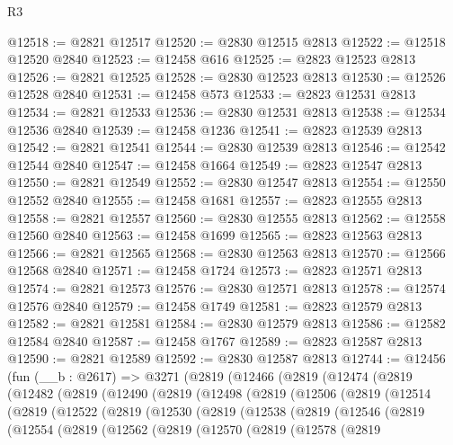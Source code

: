 \begin{lexlean}{R3}
\begin{coremodule}
@12518 := @2821 @12517
@12520 := @2830 @12515 @2813
@12522 := @12518 @12520 @2840
@12523 := @12458 @616
@12525 := @2823 @12523 @2813
@12526 := @2821 @12525
@12528 := @2830 @12523 @2813
@12530 := @12526 @12528 @2840
@12531 := @12458 @573
@12533 := @2823 @12531 @2813
@12534 := @2821 @12533
@12536 := @2830 @12531 @2813
@12538 := @12534 @12536 @2840
@12539 := @12458 @1236
@12541 := @2823 @12539 @2813
@12542 := @2821 @12541
@12544 := @2830 @12539 @2813
@12546 := @12542 @12544 @2840
@12547 := @12458 @1664
@12549 := @2823 @12547 @2813
@12550 := @2821 @12549
@12552 := @2830 @12547 @2813
@12554 := @12550 @12552 @2840
@12555 := @12458 @1681
@12557 := @2823 @12555 @2813
@12558 := @2821 @12557
@12560 := @2830 @12555 @2813
@12562 := @12558 @12560 @2840
@12563 := @12458 @1699
@12565 := @2823 @12563 @2813
@12566 := @2821 @12565
@12568 := @2830 @12563 @2813
@12570 := @12566 @12568 @2840
@12571 := @12458 @1724
@12573 := @2823 @12571 @2813
@12574 := @2821 @12573
@12576 := @2830 @12571 @2813
@12578 := @12574 @12576 @2840
@12579 := @12458 @1749
@12581 := @2823 @12579 @2813
@12582 := @2821 @12581
@12584 := @2830 @12579 @2813
@12586 := @12582 @12584 @2840
@12587 := @12458 @1767
@12589 := @2823 @12587 @2813
@12590 := @2821 @12589
@12592 := @2830 @12587 @2813
@12744 := @12456
    (fun (__b : @2617) =>
    @3271
      (@2819
        (@12466
          (@2819
            (@12474
              (@2819
                (@12482
                  (@2819
                    (@12490
                      (@2819
                        (@12498
                          (@2819
                            (@12506
                              (@2819
                                (@12514
                                  (@2819
                                    (@12522
                                      (@2819
                                        (@12530
                                          (@2819
                                            (@12538
                                              (@2819
                                                (@12546
                                                  (@2819
                                                    (@12554
                                                      (@2819
                                                        (@12562
                                                          (@2819
                                                            (@12570
                                                              (@2819
                                                                (@12578
                                                                  (@2819

\end{coremodule}
\end{lexlean}

